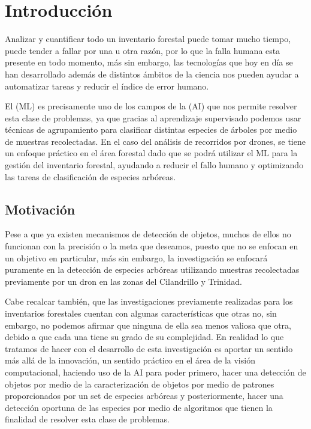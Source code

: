 \chapter{Introducción}
Analizar y cuantificar todo un inventario forestal puede tomar mucho tiempo, puede tender a fallar por una u otra razón, por lo que la falla humana esta presente en todo momento, más sin embargo, las tecnologías que hoy en día se han desarrollado además de distintos ámbitos de la ciencia nos pueden ayudar a automatizar tareas y reducir el índice de error humano.

El  (ML)    es precisamente uno de los campos de la   (AI) que nos permite resolver esta clase de problemas, ya que gracias al aprendizaje supervisado podemos usar técnicas de agrupamiento para clasificar distintas especies de árboles por medio de muestras recolectadas. En el caso del análisis de recorridos por drones, se tiene un enfoque práctico en el área forestal dado que se podrá utilizar el ML para la gestión del inventario forestal, ayudando a reducir el fallo humano y optimizando las tareas de clasificación de especies arbóreas.

\section{Motivación}
Pese a que ya existen mecanismos de detección de objetos, muchos de ellos no funcionan con la precisión o la meta que deseamos, puesto que no se enfocan en un objetivo en particular, más sin embargo, la investigación se enfocará puramente en la detección de especies arbóreas utilizando muestras recolectadas previamente por un dron en las zonas del Cilandrillo y Trinidad.

Cabe recalcar también, que las investigaciones previamente realizadas para los inventarios forestales cuentan con algunas características que otras no, sin embargo, no podemos afirmar que ninguna de ella sea menos valiosa que otra, debido a que cada una tiene su grado de su complejidad. En realidad lo que tratamos de hacer con el desarrollo de esta investigación es aportar un sentido más allá de la innovación, un sentido práctico en el área de la visión computacional, haciendo uso de la AI para poder primero, hacer una detección de objetos por medio de la caracterización de objetos por medio de patrones proporcionados por un set de especies arbóreas y posteriormente, hacer una detección oportuna de las especies por medio de algoritmos que tienen la finalidad de resolver esta clase de problemas.

